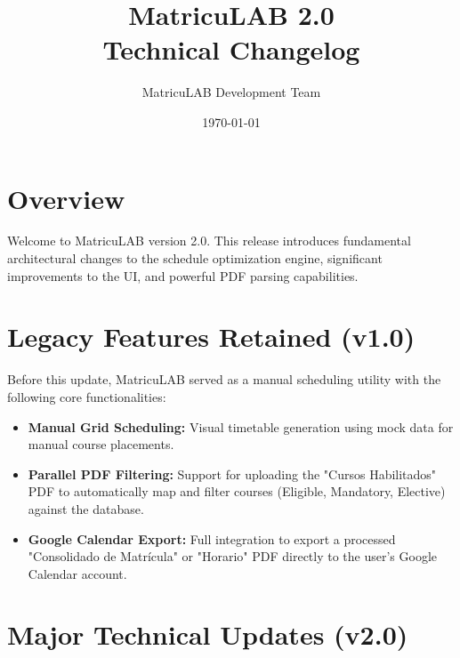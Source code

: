 \documentclass[12pt,a4paper]{article}
\title{\textbf{MatricuLAB 2.0} \\ \Large Technical Changelog}
\author{MatricuLAB Development Team}
\date{\today}
\begin{document}
\maketitle

\section*{Overview}
Welcome to MatricuLAB version 2.0. This release introduces fundamental architectural changes to the schedule optimization engine, significant improvements to the UI, and powerful PDF parsing capabilities.

\section{Legacy Features Retained (v1.0)}
Before this update, MatricuLAB served as a manual scheduling utility with the following core functionalities:
\begin{itemize}[label=\textcolor{blue}{\textbullet}]
    \item \textbf{Manual Grid Scheduling:} Visual timetable generation using mock data for manual course placements.
    \item \textbf{Parallel PDF Filtering:} Support for uploading the "Cursos Habilitados" PDF to automatically map and filter courses (Eligible, Mandatory, Elective) against the database.
    \item \textbf{Google Calendar Export:} Full integration to export a processed "Consolidado de Matrícula" or "Horario" PDF directly to the user's Google Calendar account.
\end{itemize}

\section{Major Technical Updates (v2.0)}
\end{document}
